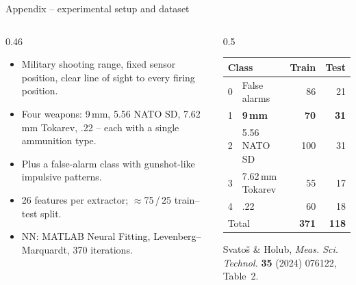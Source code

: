 \documentclass[aspectratio=169,10pt]{beamer}
\newcommand{\gtcc}[1]{\textbf{\color{accent}#1}}
\begin{document}
\begin{frame}{Appendix -- experimental setup and dataset}
  \begin{columns}[T,onlytextwidth]
    \begin{column}{0.46\textwidth}
      \small
      \begin{itemize}
        \item Military shooting range, fixed sensor position, clear line of sight to
              every firing position.
        \item Four weapons: 9\,mm, 5.56 NATO SD, 7.62\,mm Tokarev, .22 -- each with a
              single ammunition type.
        \item Plus a false-alarm class with gunshot-like impulsive patterns.
        \item 26 features per extractor; $\approx$75\,/\,25 train--test split.
        \item NN: MATLAB Neural Fitting, Levenberg--Marquardt, 370 iterations.
      \end{itemize}
    \end{column}
    \begin{column}{0.5\textwidth}
      \centering\footnotesize
      \begin{tabular}{llrr}
        \toprule
        \multicolumn{2}{l}{Class} & Train & Test\\
        \midrule
        0 & False alarms      &  86 &  21\\
        1 & \gtcc{9\,mm}      &  \gtcc{70} &  \gtcc{31}\\
        2 & 5.56 NATO SD      & 100 &  31\\
        3 & 7.62\,mm Tokarev  &  55 &  17\\
        4 & .22               &  60 &  18\\
        \midrule
        \multicolumn{2}{l}{Total} & \textbf{371} & \textbf{118}\\
        \bottomrule
      \end{tabular}
      \par\vspace{2mm}
      {\scriptsize Svatoš \& Holub, \emph{Meas. Sci. Technol.} \textbf{35} (2024) 076122,
       Table~2.}
    \end{column}
  \end{columns}
\end{frame}
\end{document}
